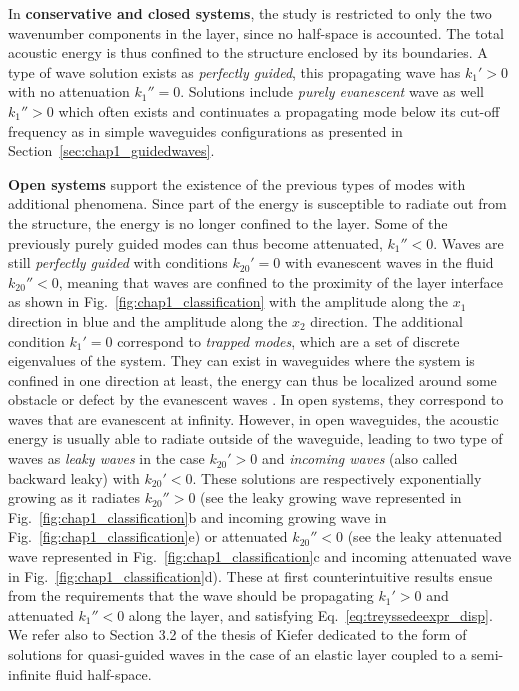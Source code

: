 In \textbf{conservative and closed systems}, the study is restricted to only the two wavenumber components in the layer, since no half-space is accounted. The total acoustic energy is thus confined to the structure enclosed by its boundaries.  A type of wave solution exists as \textit{perfectly guided}, this propagating wave has $k_1' > 0$ with no attenuation $k_1'' = 0$. Solutions include \textit{purely evanescent} wave as well $k_1'' > 0$ which often exists and continuates a propagating mode below its cut-off frequency as in simple waveguides configurations as presented in Section~\ref{sec:chap1_guidedwaves}.

\textbf{Open systems} support the existence of the previous types of modes with additional phenomena. Since part of the energy is susceptible to radiate out from the structure, the energy is no longer confined to the layer. Some of the previously purely guided modes can thus become attenuated, $k_1'' < 0$. Waves are still \textit{perfectly guided} with conditions $k_{20}' = 0$ with evanescent waves in the fluid $k_{20}'' < 0$, meaning that waves are confined to the proximity of the layer interface as shown in Fig.~\ref{fig:chap1_classification} with the amplitude along the $x_1$ direction in blue and the amplitude along the $x_2$ direction. The additional condition $k_1' = 0$ correspond to \textit{trapped modes}, which are a set of discrete eigenvalues of the system. They can exist in waveguides where the system is confined in one direction at least, the energy can thus be localized around some obstacle or defect by the evanescent waves \cite{pagneux2013, roitberg1998}. In open systems, they correspond to  waves that are evanescent at infinity. However, in open waveguides, the acoustic energy is usually able to radiate outside of the waveguide, leading to two type of waves as \textit{leaky waves} in the case $k_{20}' > 0$ and \textit{incoming waves} (also called backward leaky) with $k_{20}' < 0$. These solutions are respectively exponentially growing as it radiates $k_{20}'' > 0$ (see the leaky growing wave represented in Fig.~\ref{fig:chap1_classification}b and incoming growing wave in Fig.~\ref{fig:chap1_classification}e) or attenuated $k_{20}'' < 0$ (see the leaky attenuated wave represented in Fig.~\ref{fig:chap1_classification}c and incoming attenuated wave in Fig.~\ref{fig:chap1_classification}d). These at first counterintuitive results ensue from the requirements that the wave should be propagating $k_1' > 0$ and attenuated $k_1'' < 0$ along the layer, and satisfying Eq.~\ref{eq:treyssedeexpr_disp}. We refer also to Section 3.2 of the thesis of Kiefer \cite{kiefer2022} dedicated to the form of solutions for quasi-guided waves in the case of an elastic layer coupled to a semi-infinite fluid half-space. 


